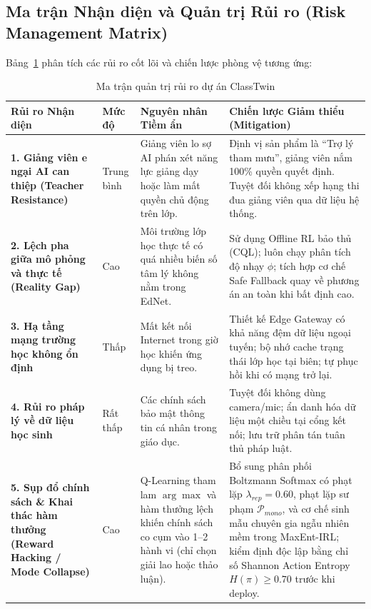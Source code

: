 \subsection{Ma trận Nhận diện và Quản trị Rủi ro (Risk Management Matrix)}\label{subsec:ma-tran-rui-ro}
Bảng~\ref{tab:risk-matrix} phân tích các rủi ro cốt lõi và chiến lược phòng vệ tương ứng:

\begin{table}[htbp]
  \centering\small
  \caption{Ma trận quản trị rủi ro dự án ClassTwin}\label{tab:risk-matrix}
  \begin{tabularx}{\textwidth}{p{3.2cm} p{2.2cm} p{4.2cm} X}
    \toprule
    \textbf{Rủi ro Nhận diện} & \textbf{Mức độ} & \textbf{Nguyên nhân Tiềm ẩn} & \textbf{Chiến lược Giảm thiểu (Mitigation)} \\
    \midrule
    \textbf{1. Giảng viên e ngại AI can thiệp (Teacher Resistance)} & Trung bình & Giảng viên lo sợ AI phán xét năng lực giảng dạy hoặc làm mất quyền chủ động trên lớp. & Định vị sản phẩm là ``Trợ lý tham mưu'', giảng viên nắm 100\% quyền quyết định. Tuyệt đối không xếp hạng thi đua giảng viên qua dữ liệu hệ thống. \\
    \addlinespace
    \textbf{2. Lệch pha giữa mô phỏng và thực tế (Reality Gap)} & Cao & Môi trường lớp học thực tế có quá nhiều biến số tâm lý không nằm trong EdNet. & Sử dụng Offline RL bảo thủ (CQL); luôn chạy phân tích độ nhạy $\phi$; tích hợp cơ chế Safe Fallback quay về phương án an toàn khi bất định cao. \\
    \addlinespace
    \textbf{3. Hạ tầng mạng trường học không ổn định} & Thấp & Mất kết nối Internet trong giờ học khiến ứng dụng bị treo. & Thiết kế Edge Gateway có khả năng đệm dữ liệu ngoại tuyến; bộ nhớ cache trạng thái lớp học tại biên; tự phục hồi khi có mạng trở lại. \\
    \addlinespace
    \textbf{4. Rủi ro pháp lý về dữ liệu học sinh} & Rất thấp & Các chính sách bảo mật thông tin cá nhân trong giáo dục. & Tuyệt đối không dùng camera/mic; ẩn danh hóa dữ liệu một chiều tại cổng kết nối; lưu trữ phân tán tuân thủ pháp luật. \\
    \addlinespace
    \textbf{5. Sụp đổ chính sách \& Khai thác hàm thưởng (Reward Hacking / Mode Collapse)} & Cao & Q-Learning tham lam $\arg\max$ và hàm thưởng lệch khiến chính sách co cụm vào 1--2 hành vi (chỉ chọn giải lao hoặc thảo luận). & Bổ sung phân phối Boltzmann Softmax có phạt lặp $\lambda_{rep} = 0.60$, phạt lặp sư phạm $\mathcal{P}_{mono}$, và cơ chế sinh mẫu chuyên gia ngẫu nhiên mềm trong MaxEnt-IRL; kiểm định độc lập bằng chỉ số Shannon Action Entropy $H(\pi) \ge 0.70$ trước khi deploy. \\
    \bottomrule
  \end{tabularx}
\end{table}

